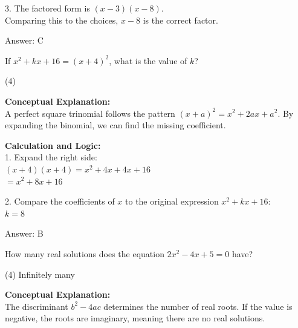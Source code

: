 \documentclass[11pt,paper=a4,answers]{exam}
\begin{document}
\begin{questions}
\begin{solution}
3. The factored form is $(x - 3)(x - 8)$. \\
   Comparing this to the choices, $x - 8$ is the correct factor.

\vspace{20pt}

Answer: \colorbox{yellow!100}{C}
\end{solution}

\vspace{30pt}

\question
If $x^2 + kx + 16 = (x + 4)^2$, what is the value of $k$?
\begin{tasks}(4)
\end{tasks}

\begin{solution}
\textbf{Conceptual Explanation:} \\
A perfect square trinomial follows the pattern $(x + a)^2 = x^2 + 2ax + a^2$. By expanding the binomial, we can find the missing coefficient.

\vspace{15pt}

\textbf{Calculation and Logic:} \\
1. Expand the right side: \\
   $(x + 4)(x + 4) = x^2 + 4x + 4x + 16$ \\
   $= x^2 + 8x + 16$

\vspace{10pt}

2. Compare the coefficients of $x$ to the original expression $x^2 + kx + 16$: \\
   $k = 8$

\vspace{20pt}

Answer: \colorbox{yellow!100}{B}
\end{solution}

\vspace{30pt}

\question
How many real solutions does the equation $2x^2 - 4x + 5 = 0$ have?
\begin{tasks}(4)
    \task Infinitely many
\end{tasks}

\begin{solution}
\textbf{Conceptual Explanation:} \\
The discriminant $b^2 - 4ac$ determines the number of real roots. If the value is negative, the roots are imaginary, meaning there are no real solutions.


\end{solution}
\end{questions}
\end{document}
